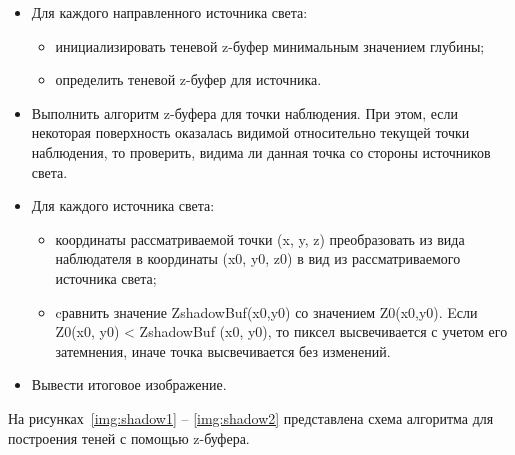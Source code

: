 \begin{itemize}[label={$\bullet$}]
    \item Для каждого направленного источника света:
    \begin{itemize}[label={$\circ$}]
        \item инициализировать теневой z-буфер минимальным значением глубины; 
        \item определить теневой z-буфер для источника. 
    \end{itemize}
    \item Выполнить алгоритм z-буфера для точки наблюдения. 
    При этом, если некоторая поверхность оказалась видимой относительно 
    текущей точки наблюдения, то проверить, видима ли данная точка со стороны 
    источников света. 
    \item Для каждого источника света: 
    \begin{itemize}[label={$\circ$}]
        \item координаты рассматриваемой точки (x, y, z) преобразовать 
        из вида наблюдателя в координаты (x0, y0, z0) в вид из рассматриваемого источника света; 
        \item cравнить значение ZshadowBuf(x0,y0) со значением Z0(x0,y0). 
        Eсли Z0(x0, y0) < ZshadowBuf (x0, y0), то пиксел высвечивается с учетом его затемнения, 
        иначе точка высвечивается без изменений. 
    \end{itemize}
    \item Вывести итоговое изображение.
\end{itemize}

На рисунках~\ref{img:shadow1} -- \ref{img:shadow2} представлена схема алгоритма для построения теней с помощью z-буфера.

